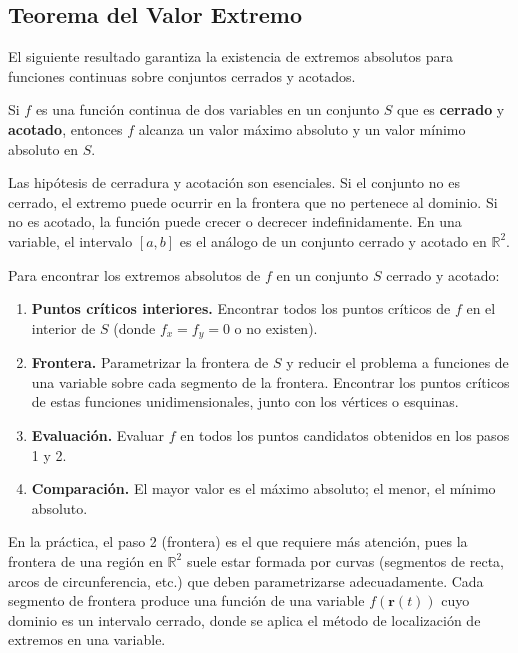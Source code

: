 \subsection{Teorema del Valor Extremo}

El siguiente resultado garantiza la existencia de extremos absolutos para
funciones continuas sobre conjuntos cerrados y acotados.

\begin{theorem}
Si $f$ es una función continua de dos variables en un conjunto $S$ que es
\textbf{cerrado} y \textbf{acotado}, entonces $f$ alcanza un valor
máximo absoluto y un valor mínimo absoluto en $S$.
\end{theorem}

\begin{rem}
Las hipótesis de cerradura y acotación son esenciales. Si el conjunto no
es cerrado, el extremo puede ocurrir en la frontera que no pertenece al
dominio. Si no es acotado, la función puede crecer o decrecer
indefinidamente. En una variable, el intervalo $[a,b]$ es el análogo de
un conjunto cerrado y acotado en $\mathbb{R}^2$.
\end{rem}

\begin{pasos}
Para encontrar los extremos absolutos de $f$ en un conjunto $S$ cerrado y
acotado:
\begin{enumerate}
    \item \textbf{Puntos críticos interiores.} Encontrar todos los
    puntos críticos de $f$ en el interior de $S$ (donde $f_x=f_y=0$ o no
    existen).
    \item \textbf{Frontera.} Parametrizar la frontera de $S$ y reducir el
    problema a funciones de una variable sobre cada segmento de la
    frontera. Encontrar los puntos críticos de estas funciones
    unidimensionales, junto con los vértices o esquinas.
    \item \textbf{Evaluación.} Evaluar $f$ en todos los puntos candidatos
    obtenidos en los pasos 1 y 2.
    \item \textbf{Comparación.} El mayor valor es el máximo absoluto; el
    menor, el mínimo absoluto.
\end{enumerate}
\end{pasos}

\begin{rem}
En la práctica, el paso 2 (frontera) es el que requiere más atención,
pues la frontera de una región en $\mathbb{R}^2$ suele estar formada por
curvas (segmentos de recta, arcos de circunferencia, etc.) que deben
parametrizarse adecuadamente. Cada segmento de frontera produce una
función de una variable $f(\mathbf{r}(t))$ cuyo dominio es un intervalo
cerrado, donde se aplica el método de localización de extremos en una
variable.
\end{rem}

